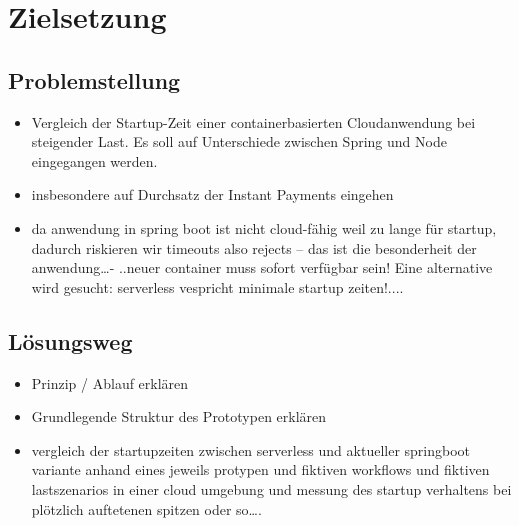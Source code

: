 \chapter{Zielsetzung}

\section{Problemstellung}
\begin{itemize}
  \item Vergleich der Startup-Zeit einer containerbasierten Cloudanwendung bei steigender Last. Es soll auf Unterschiede zwischen Spring und Node eingegangen werden.
  \item insbesondere auf Durchsatz der Instant Payments eingehen
  \item da anwendung in spring boot ist nicht cloud-fähig weil zu lange für startup, dadurch riskieren wir timeouts also rejects – das ist die besonderheit der anwendung…- ..neuer container muss sofort verfügbar sein! Eine alternative wird gesucht: serverless vespricht minimale startup zeiten!....
\end{itemize}



\section{L\"osungsweg}
\begin{itemize}
  \item Prinzip / Ablauf erklären
  \item Grundlegende Struktur des Prototypen erklären
  \item vergleich der startupzeiten zwischen serverless und aktueller springboot variante anhand eines jeweils protypen und fiktiven workflows und fiktiven lastszenarios in einer cloud umgebung und messung des startup verhaltens bei plötzlich auftetenen spitzen oder so….
\end{itemize}


\cite{Knuth:1998:ACP:280635}
